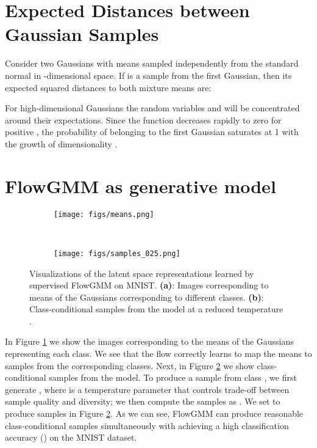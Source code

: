 \documentclass{article}
\newcommand{\method}{FlowGMM\xspace}
\begin{document}
\section{Expected Distances between Gaussian Samples}
\label{sec:calibration_derivation}

Consider two Gaussians with means sampled independently from the standard normal  in -dimensional space.  If  is a sample from the first Gaussian, then its expected squared distances to both mixture means are:




For high-dimensional Gaussians the random variables  and  will be concentrated around their expectations.
Since the function  decreases rapidly to zero for positive , the probability of  belonging to the first Gaussian  saturates at 1 with the growth of dimensionality .

\section{\method as generative model}
\label{sec:samples}

\begin{figure}[h!]
	\centering
	\begin{subfigure}{0.02\textwidth}
		\texttt{[image: figs/means.png]}
		\caption{}\label{fig:means}
	\end{subfigure}
	~~
	\begin{subfigure}{0.2\textwidth}
		\texttt{[image: figs/samples\_025.png]}
		\caption{
		}\label{fig:samples}
	\end{subfigure}
	\caption{
		Visualizations of the latent space representations learned by supervised \method
    	on MNIST. 
        \textbf{(a)}: Images corresponding to means of the Gaussians corresponding to 
        different classes. 
        \textbf{(b)}: Class-conditional samples from the model at a reduced temperature .}
        \label{fig:mean_samples}
\end{figure}

In Figure \ref{fig:means} we show the images  corresponding
to the means of the Gaussians representing each class.
We see that the flow correctly learns to map the means to samples from the corresponding classes.
Next, in Figure \ref{fig:samples} we show class-conditional samples from the model. To produce a sample from class , we first generate ,
where  is a temperature parameter 
that controls trade-off between sample quality
and diversity; we then compute the samples as . 
We set  to produce samples in Figure \ref{fig:samples}. 
As we can see, \method can produce reasonable class-conditional samples simultaneously
with achieving a high classification accuracy () on the MNIST dataset.
\end{document}
